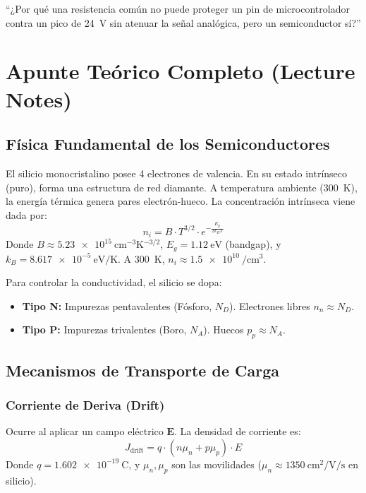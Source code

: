 \documentclass[11pt, a4paper]{article}
\begin{document}
\begin{bloqueclase}
    ``¿Por qué una resistencia común no puede proteger un pin de microcontrolador contra un pico de \qty{+24}{\volt} sin atenuar la señal analógica, pero un semiconductor sí?''
\end{bloqueclase}

\newpage
\section{Apunte Teórico Completo (Lecture Notes)}

\subsection{Física Fundamental de los Semiconductores}
El silicio monocristalino posee 4 electrones de valencia. En su estado intrínseco (puro), forma una estructura de red diamante. A temperatura ambiente (\qty{300}{\kelvin}), la energía térmica genera pares electrón-hueco. La concentración intrínseca viene dada por:
\begin{equation}
    n_i = B \cdot T^{3/2} \cdot e^{-\frac{E_g}{2 k_B T}}
\end{equation}
Donde $B \approx \qty{5.23e15}{\centi\meter^{-3}\kelvin^{-3/2}}$, $E_g = \qty{1.12}{\electronvolt}$ (bandgap), y $k_B = \qty{8.617e-5}{\electronvolt\per\kelvin}$. A \qty{300}{\kelvin}, $n_i \approx \qty{1.5e10}{\per\centi\meter\cubed}$.

Para controlar la conductividad, el silicio se dopa:
\begin{itemize}
    \item \textbf{Tipo N:} Impurezas pentavalentes (Fósforo, $N_D$). Electrones libres $n_n \approx N_D$.
    \item \textbf{Tipo P:} Impurezas trivalentes (Boro, $N_A$). Huecos $p_p \approx N_A$.
\end{itemize}

\subsection{Mecanismos de Transporte de Carga}
\subsubsection{Corriente de Deriva (Drift)}
Ocurre al aplicar un campo eléctrico $\mathbf{E}$. La densidad de corriente es:
\begin{equation}
    J_{\text{drift}} = q \cdot (n \mu_n + p \mu_p) \cdot E
\end{equation}
Donde $q = \qty{1.602e-19}{\coulomb}$, y $\mu_n, \mu_p$ son las movilidades ($\mu_n \approx \qty{1350}{\centi\meter\squared\per\volt\per\second}$ en silicio).
\end{document}
